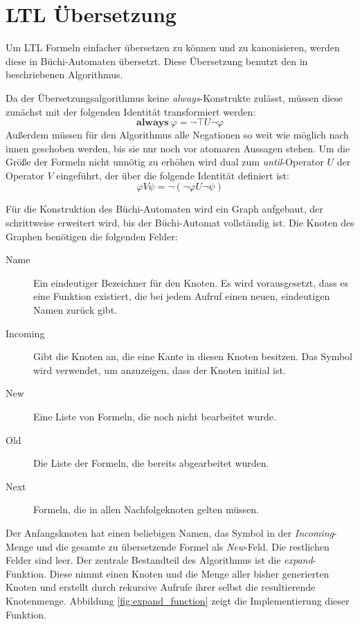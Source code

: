 \section{LTL Übersetzung}
\label{sec:ltl-translation}
Um LTL Formeln einfacher übersetzen zu können und zu kanonisieren, werden diese in Büchi-Automaten übersetzt.
Diese Übersetzung benutzt den in \cite{Gerth95simpleon-the-fly} beschriebenen Algorithmus.

Da der Übersetzungsalgorithmus keine \emph{always}-Konstrukte zulässt, müssen diese zunächst mit der folgenden Identität transformiert werden:
\[ \textbf{always}\ \varphi = \lnot\top U \lnot\varphi \]
Außerdem müssen für den Algorithmus alle Negationen so weit wie möglich nach innen geschoben werden, bis sie nur noch vor atomaren Aussagen stehen.
Um die Größe der Formeln nicht unnötig zu erhöhen wird dual zum \emph{until}-Operator $U$ der Operator $V$ eingeführt, der über die folgende Identität definiert ist:
\[ \varphi V\psi = \lnot (\lnot\varphi U\lnot\psi) \]

Für die Konstruktion des Büchi-Automaten wird ein Graph aufgebaut, der schrittweise erweitert wird, bis der Büchi-Automat vollständig ist.
Die Knoten des Graphen benötigen die folgenden Felder:
\begin{description}
\item[Name] Ein eindeutiger Bezeichner für den Knoten.
  Es wird vorausgesetzt, dass es eine Funktion  existiert, die bei jedem Aufruf einen neuen, eindeutigen Namen zurück gibt.
\item[Incoming] Gibt die Knoten an, die eine Kante in diesen Knoten besitzen.
  Das Symbol  wird verwendet, um anzuzeigen, dass der Knoten initial ist.
\item[New] Eine Liste von Formeln, die noch nicht bearbeitet wurde.
\item[Old] Die Liste der Formeln, die bereits abgearbeitet wurden.
\item[Next] Formeln, die in allen Nachfolgeknoten gelten müssen.
\end{description}
Der Anfangsknoten hat einen beliebigen Namen, das Symbol  in der \emph{Incoming}-Menge und die gesamte zu übersetzende Formel als \emph{New}-Feld.
Die restlichen Felder sind leer.
Der zentrale Bestandteil des Algorithmus ist die \emph{expand}-Funktion.
Diese nimmt einen Knoten und die Menge aller bisher generierten Knoten und erstellt durch rekursive Aufrufe ihrer selbst die resultierende Knotenmenge.
Abbildung \ref{fig:expand_function} zeigt die Implementierung dieser Funktion.

